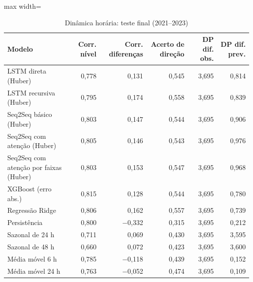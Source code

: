 \begin{table}[!htbp]
    \centering
    \caption{Dinâmica horária: teste final (2021--2023)}
    \label{tab:dinamica_holdout}
    \small
    \begin{adjustbox}{max width=\textwidth}
    \begin{tabular}{lrrrrr}
        \toprule
        Modelo & Corr. nível & Corr. diferenças & Acerto de direção & DP dif. obs. & DP dif. prev. \\
        \midrule
        LSTM direta (Huber) & 0,778 & 0,131 & 0,545 & 3,695 & 0,814 \\
        LSTM recursiva (Huber) & 0,795 & 0,174 & 0,558 & 3,695 & 0,839 \\
        Seq2Seq básico (Huber) & 0,803 & 0,147 & 0,544 & 3,695 & 0,906 \\
        Seq2Seq com atenção (Huber) & 0,805 & 0,146 & 0,543 & 3,695 & 0,976 \\
        Seq2Seq com atenção por faixas (Huber) & 0,803 & 0,153 & 0,547 & 3,695 & 0,968 \\
        XGBoost (erro abs.) & 0,815 & 0,128 & 0,544 & 3,695 & 0,780 \\
        Regressão Ridge & 0,806 & 0,162 & 0,557 & 3,695 & 0,739 \\
        \midrule
        Persistência & 0,800 & $-$0,332 & 0,315 & 3,695 & 0,212 \\
        Sazonal de 24 h & 0,711 & 0,069 & 0,430 & 3,695 & 3,595 \\
        Sazonal de 48 h & 0,660 & 0,072 & 0,423 & 3,695 & 3,600 \\
        Média móvel 6 h & 0,785 & $-$0,118 & 0,439 & 3,695 & 0,152 \\
        Média móvel 24 h & 0,763 & $-$0,052 & 0,474 & 3,695 & 0,109 \\
        \bottomrule
    \end{tabular}
    \end{adjustbox}
\end{table}
